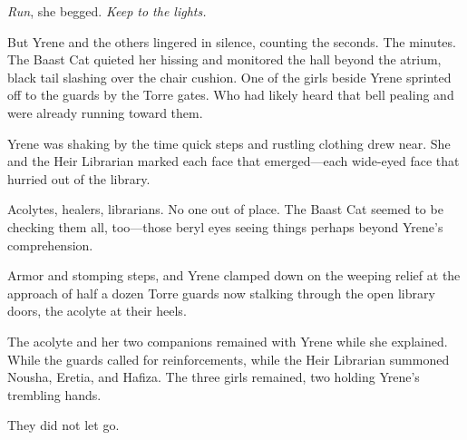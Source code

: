 \emph{Run}, she begged. \emph{Keep to the lights.}

But Yrene and the others lingered in silence, counting the seconds. The minutes. The Baast Cat quieted her hissing and monitored the hall beyond the atrium, black tail slashing over the chair cushion. One of the girls beside Yrene sprinted off to the guards by the Torre gates. Who had likely heard that bell pealing and were already running toward them.

Yrene was shaking by the time quick steps and rustling clothing drew near. She and the Heir Librarian marked each face that emerged---each wide-eyed face that hurried out of the library.

Acolytes, healers, librarians. No one out of place. The Baast Cat seemed to be checking them all, too---those beryl eyes seeing things perhaps beyond Yrene's comprehension.

Armor and stomping steps, and Yrene clamped down on the weeping relief at the approach of half a dozen Torre guards now stalking through the open library doors, the acolyte at their heels.

The acolyte and her two companions remained with Yrene while she explained. While the guards called for reinforcements, while the Heir Librarian summoned Nousha, Eretia, and Hafiza. The three girls remained, two holding Yrene's trembling hands.

They did not let go.

